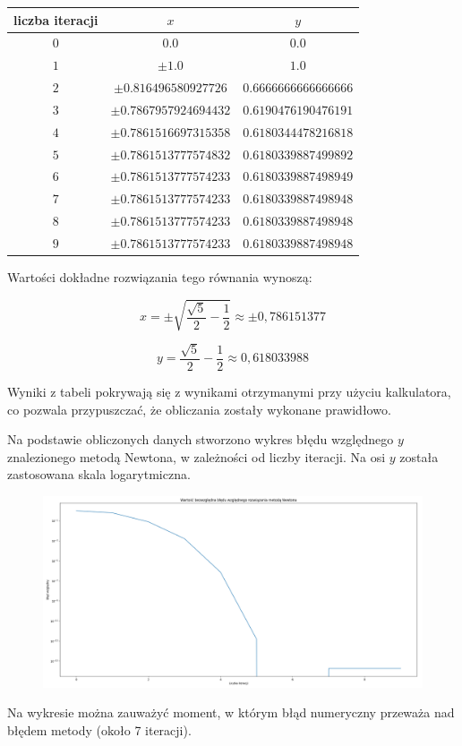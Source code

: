 \documentclass{article}
\begin{document}
	\begin{center}
		\begin{tabular}{c|c|c}
  			\hline 
  			liczba iteracji & $x$ & $y$\\
  			\hline
  			$0$ & $0.0$ & $0.0$\\
  			$1$ & $\pm 1.0$ & $1.0$\\
  			$2$ & $\pm 0.816496580927726$ & $0.6666666666666666$\\
			$3$ & $\pm 0.7867957924694432$ & $0.6190476190476191$\\
  			$4$ & $\pm 0.7861516697315358$ & $0.6180344478216818$\\
  			$5$ & $\pm 0.7861513777574832$ & $0.6180339887499892$\\
			$6$ & $\pm 0.7861513777574233$ & $0.6180339887498949$\\
  			$7$ & $\pm 0.7861513777574233$ & $0.6180339887498948$\\
  			$8$ & $\pm 0.7861513777574233$ & $0.6180339887498948$\\
			$9$ & $\pm 0.7861513777574233$ & $0.6180339887498948$\\
		\end{tabular} 
		
	\end{center}	

	Wartości dokładne rozwiązania tego równania wynoszą:

	\begin{equation}
		x = \pm \sqrt{\frac{\sqrt{5}}{2} - \frac{1}{2}} \approx \pm 0,786151377
	\end{equation}

	\begin{equation}
		y = \frac{\sqrt{5}}{2} - \frac{1}{2} \approx 0,618033988
	\end{equation}


	Wyniki z tabeli pokrywają się z wynikami otrzymanymi przy użyciu kalkulatora, co pozwala przypuszczać, że obliczania zostały wykonane prawidłowo. 

	Na podstawie obliczonych danych stworzono wykres błędu względnego $y$ znalezionego metodą Newtona, w zależności od liczby iteracji. Na osi $y$ została zastosowana skala logarytmiczna.


	\begin{figure}[h]
		\centering
		\includegraphics[scale = 0.3]{wykres3.png}
	\end{figure}

	Na wykresie można zauważyć moment, w którym błąd numeryczny przeważa nad błędem metody (około 7 iteracji).



	



	
	
	
	
	
	
	
	
	
\end{document}
